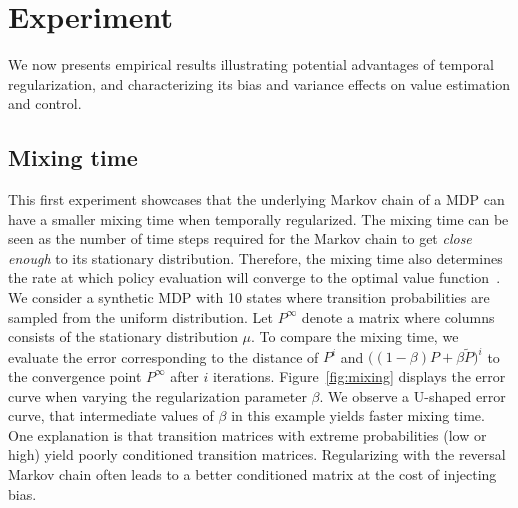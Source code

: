 \documentclass{article}
\newcommand{\param}{\beta}
\begin{document}
\section{Experiment}
We now presents empirical results illustrating potential advantages of temporal regularization, and characterizing its bias and variance effects on value estimation and control.



\subsection{Mixing time}
This first experiment showcases that the underlying Markov chain of a MDP can have a smaller mixing time when temporally regularized. The mixing time can be seen as the number of time steps required for the Markov chain to get \emph{close enough} to its stationary distribution. Therefore, the mixing time also determines the rate at which policy evaluation will converge to the optimal value function~\citep{baxter2001infinite}. 
We consider a synthetic MDP with 10 states where transition probabilities are sampled from the uniform distribution. Let $P^{\infty}$ denote a matrix where columns consists of the stationary distribution $\mu$. To compare the mixing time, we evaluate the error corresponding to the distance of $P^i$ and $\big((1-\param)P+\param \widetilde{P}\big)^i$ to the convergence point $P^{\infty}$ after $i$ iterations.
%
Figure~\ref{fig:mixing} displays the error curve when varying the regularization parameter $\param$. We observe a U-shaped error curve, that intermediate values of $\param$ in this example yields faster mixing time.
One explanation is that transition matrices with extreme probabilities (low or high) yield poorly conditioned transition matrices. Regularizing with the reversal Markov chain often leads to a better conditioned matrix at the cost of injecting bias.
\end{document}
